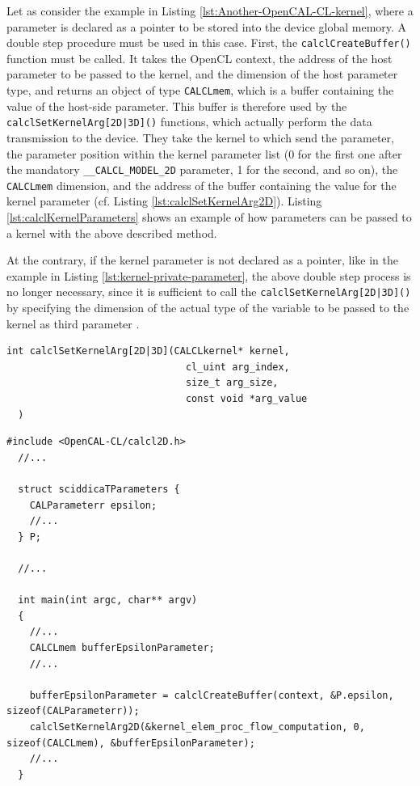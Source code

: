 Let as consider the example in Listing
\ref{lst:Another-OpenCAL-CL-kernel}, where a parameter is declared as
a pointer to be stored into the device global memory. A double step
procedure must be used in this case. First, the
\verb'calclCreateBuffer()' function must be called. It takes the
OpenCL context, the address of the host parameter to be passed to the
kernel, and the dimension of the host parameter type, and returns an
object of type \verb'CALCLmem', which is a buffer containing the value
of the host-side parameter. This buffer is therefore used by the
\verb'calclSetKernelArg[2D|3D]()' functions, which actually perform
the data transmission to the device. They take the kernel to which send
the parameter, the parameter position within the kernel parameter list
(0 for the first one after the mandatory \verb'__CALCL_MODEL_2D'
parameter, 1 for the second, and so on), the \verb'CALCLmem'
dimension, and the address of the buffer containing the value for the
kernel parameter (cf. Listing \ref{lst:calclSetKernelArg2D}). Listing \ref{lst:calclKernelParameters} shows an example of how
parameters can be passed to a kernel with the above described method.

At the contrary, if the kernel parameter is not declared as a pointer,
like in the example in Listing \ref{lst:kernel-private-parameter}, the
above double step process is no longer necessary, since it is
sufficient to call the \verb'calclSetKernelArg[2D|3D]()' by specifying
the dimension of the actual type of the variable to be passed to the
kernel as third parameter .


\begin{lstlisting}[float,floatplacement=H, label=lst:calclSetKernelArg2D, caption=The calclSetKernelArg2D() function., numbers=none]
  int calclSetKernelArg[2D|3D](CALCLkernel* kernel,
                               cl_uint arg_index,
                               size_t arg_size,
                               const void *arg_value
  )
\end{lstlisting}


\begin{lstlisting}[float,floatplacement=H, label=lst:calclKernelParameters, caption=Passing parametrs to kernel.]
  #include <OpenCAL-CL/calcl2D.h>
  //...

  struct sciddicaTParameters {
    CALParameterr epsilon;
    //...
  } P;

  //...

  int main(int argc, char** argv)
  {
    //...
    CALCLmem bufferEpsilonParameter;
    //...

    bufferEpsilonParameter = calclCreateBuffer(context, &P.epsilon, sizeof(CALParameterr));
    calclSetKernelArg2D(&kernel_elem_proc_flow_computation, 0, sizeof(CALCLmem), &bufferEpsilonParameter);
    //...
  }
\end{lstlisting}



